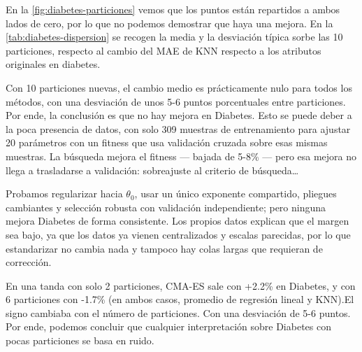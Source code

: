En la \autoref{fig:diabetes-particiones} vemos que los puntos están repartidos a ambos lados de cero, por lo que no podemos demostrar que haya una mejora. En la \autoref{tab:diabetes-dispersion} se recogen la media y la desviación típica sorbe las 10 particiones, respecto al cambio del MAE de KNN respecto a los atributos originales en diabetes. 

Con 10 particiones nuevas, el cambio medio es prácticamente nulo para todos los métodos, con una desviación de unos 5-6 puntos porcentuales entre particiones. Por ende, la conclusión es que no hay mejora en Diabetes. Esto se puede deber a la poca presencia de datos, con solo 309 muestras de entrenamiento para ajustar 20 parámetros con un fitness que usa validación cruzada sobre esas mismas muestras. La búsqueda mejora el fitness --- bajada de 5-8\% --- pero esa mejora no llega a trasladarse a validación: sobreajuste al criterio de búsqueda\dots

Probamos regularizar hacia $\theta_0$, usar un único exponente compartido, pliegues cambiantes y selección robusta con validación independiente; pero ninguna mejora Diabetes de forma consistente. Los propios datos explican que el margen sea bajo, ya que los datos ya vienen centralizados y escalas parecidas, por lo que estandarizar no cambia nada y tampoco hay colas largas que requieran de corrección. 

En una tanda con solo 2 particiones, CMA-ES sale con +2.2\% en Diabetes, y con 6 particiones con -1.7\% (en ambos casos, promedio de regresión lineal y KNN).El signo cambiaba con el número de particiones. Con una desviación de 5-6 puntos. Por ende, podemos concluir que cualquier interpretación sobre Diabetes con pocas particiones se basa en ruido.